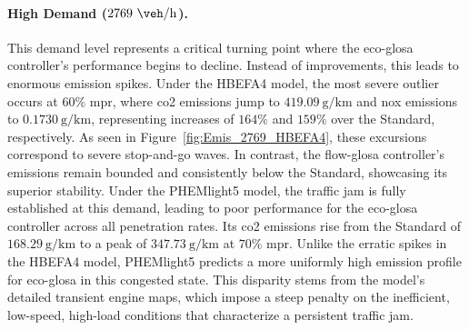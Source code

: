\paragraph{High Demand ($2769~\unit{\veh\per\hour}$).}
This demand level represents a critical turning point where the \ac{eco-glosa} controller's performance begins to decline. Instead of improvements, this leads to enormous emission spikes. Under the HBEFA4 model, the most severe outlier occurs at $60\%$ \ac{mpr}, where \ac{co2} emissions jump to $419.09~\unit{\gram\per\kilo\metre}$ and \ac{nox} emissions to $0.1730~\unit{\gram\per\kilo\metre}$, representing increases of $164\%$ and $159\%$ over the Standard, respectively. As seen in Figure~\vref{fig:Emis_2769_HBEFA4}, these excursions correspond to severe stop-and-go waves. In contrast, the \ac{flow-glosa} controller's emissions remain bounded and consistently below the Standard, showcasing its superior stability.
\mynewline
Under the PHEMlight5 model, the traffic jam is fully established at this demand, leading to poor performance for the \ac{eco-glosa} controller across all penetration rates. Its \ac{co2} emissions rise from the Standard of $168.29~\unit{\gram\per\kilo\metre}$ to a peak of $347.73~\unit{\gram\per\kilo\metre}$ at $70\%$ \ac{mpr}. Unlike the erratic spikes in the HBEFA4 model, PHEMlight5 predicts a more uniformly high emission profile for \ac{eco-glosa} in this congested state. This disparity stems from the model’s detailed transient engine maps, which impose a steep penalty on the inefficient, low-speed, high-load conditions that characterize a persistent traffic jam.

